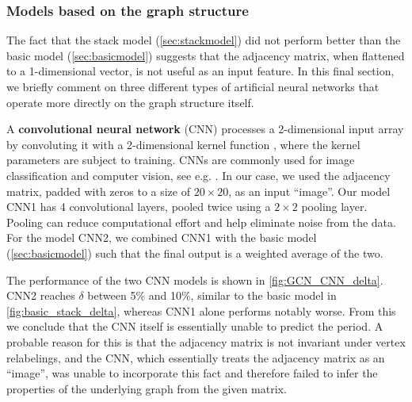 \documentclass[11pt]{scrartcl}
\numberwithin{equation}{section}
\begin{document}
\begin{figure}[htb]
\end{figure}



\subsubsection{Models based on the graph structure}\label{sec:graph_structure}


The fact that the stack model (\cref{sec:stackmodel}) did not perform better than the basic model (\cref{sec:basicmodel}) suggests that the adjacency matrix, when flattened to a 1-dimensional vector, is not useful as an input feature. In this final section, we briefly comment on  three different types of artificial neural networks that operate more directly on the graph structure itself. 

A   \textbf{convolutional neural network} (CNN) processes a 2-dimensional input array  by convoluting it with a 2-dimensional kernel function \cite{goodfellow_deep_2016}, where the kernel parameters   are subject to training. 
CNNs are commonly used for image classification and computer vision, see e.g.  \cite{alzubaidi_review_2021}. In our case, we used the adjacency matrix, padded with zeros to a size of $20\times 20$, as an input \enquote{image}. Our model CNN1 has  4 convolutional layers,   pooled twice using a $2 \times 2$ pooling layer. Pooling can reduce computational effort and help eliminate noise from the data. For the model CNN2, we combined CNN1 with the basic model (\cref{sec:basicmodel}) such that the final output is a weighted average of the two.

The performance of the two CNN models is shown in \cref{fig:GCN_CNN_delta}. CNN2 reaches $\delta$ between 5\% and 10\%, similar to the basic model in \cref{fig:basic_stack_delta}, whereas CNN1 alone performs notably worse. From this we conclude that the CNN itself is essentially unable to predict the period. A probable reason for this is that the adjacency matrix is not invariant under vertex relabelings, and the CNN, which essentially treats the adjacency matrix as an \enquote{image}, was unable to incorporate this fact and therefore failed to infer the properties of the underlying graph from the given matrix. 
\end{document}
